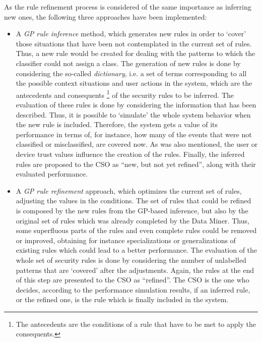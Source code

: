 As the rule refinement process is considered of the same importance as inferring new ones, the following three approaches have been implemented:

\begin{itemize}

\item A \textit{GP rule inference} method, which generates new rules in order to `cover' those situations that have been not contemplated in the current set of rules. Thus, a new rule would be created for dealing with the patterns to which the classifier could not assign a class.
The generation of new rules is done by considering the so-called \textit{dictionary}, i.e. a set of terms corresponding to all the possible context situations and user actions in the system, which are the antecedents and consequents \footnote{The antecedents are the conditions of a rule that have to be met to apply the consequents.} of the security rules to be inferred.
The evaluation of these rules is done by considering the information that has been described. Thus, it is possible to `simulate' the whole system behavior when the new rule is included. Therefore, the system gets a value of its performance in terms of, for instance, how many of the events that were not classified or misclassified, are covered now. As was also mentioned, the user or device trust values influence the creation of the rules.
Finally, the inferred rules are proposed to the CSO as ``new, but not yet refined'', along with their evaluated performance.

\item A \textit{GP rule refinement} approach, which optimizes the current set of rules, adjusting the values in the conditions. The set of rules that could be refined is composed by the new rules from the GP-based inference, but also by the original set of rules which was already completed by the Data Miner. Thus, some superfluous parts of the rules and even complete rules could be removed or improved, obtaining for instance specializations or generalizations of existing rules which could lead to a better performance. %
The evaluation of the whole set of security rules is done by considering the number of unlabelled patterns that are `covered' after the adjustments. Again, the rules at the end of this step are presented to the CSO as ``refined''. The CSO is the one who decides, according to the performance simulation results, if an inferred rule, or the refined one, is the rule which is finally included in the system.


\end{itemize}
